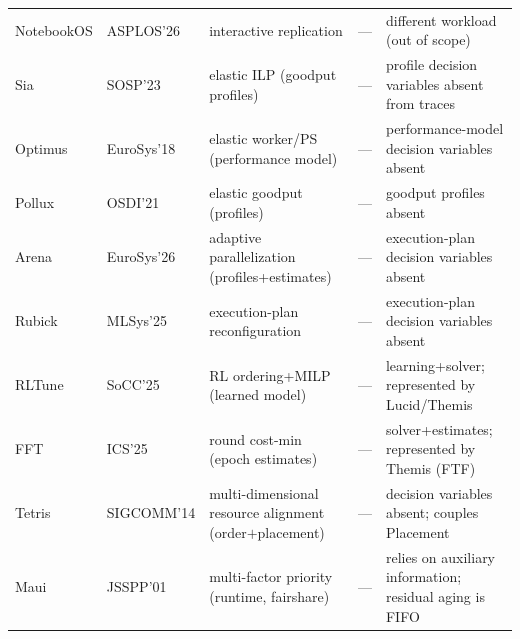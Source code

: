 \documentclass{ieeetj}
\begin{document}
\begin{table}[htb!]
\begin{tabular}{@{}lllcl@{}}
NotebookOS\cite{notebookos2026} & ASPLOS'26 & interactive replication & --- & different workload (out of scope)\\
Sia\cite{b4} & SOSP'23 & elastic ILP (goodput profiles) & --- & profile decision variables absent from traces\\
Optimus\cite{peng2018optimus} & EuroSys'18 & elastic worker/PS (performance model) & --- & performance-model decision variables absent\\
Pollux\cite{qiao2021pollux} & OSDI'21 & elastic goodput (profiles) & --- & goodput profiles absent\\
Arena\cite{arena2026} & EuroSys'26 & adaptive parallelization (profiles+estimates) & --- & execution-plan decision variables absent\\
Rubick\cite{rubick2025} & MLSys'25 & execution-plan reconfiguration & --- & execution-plan decision variables absent\\
RLTune\cite{rltune2025} & SoCC'25 & RL ordering+MILP (learned model) & --- & learning+solver; represented by Lucid/Themis\\
FFT\cite{fft2025} & ICS'25 & round cost-min (epoch estimates) & --- & solver+estimates; represented by Themis (FTF)\\
Tetris\cite{grandl2014multi} & SIGCOMM'14 & multi-dimensional resource alignment (order$+$placement) & --- & decision variables absent; couples Placement\\
Maui\cite{jackson2001maui} & JSSPP'01 & multi-factor priority (runtime, fairshare) & --- & relies on auxiliary information; residual aging is FIFO\\
\bottomrule
\end{tabular}
\end{table}
\end{document}
